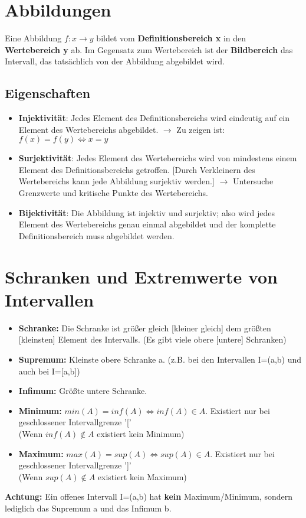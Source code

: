 \documentclass[a4paper,12pt]{article} %
\begin{document}
\section{Abbildungen}

Eine Abbildung $ f: x \rightarrow y $ bildet vom \textbf{Definitionsbereich x} in den \textbf{Wertebereich y} ab. Im Gegensatz zum Wertebereich ist der \textbf{Bildbereich} das Intervall, das tatsächlich von der Abbildung abgebildet wird.

\subsection{Eigenschaften}

\begin{itemize}
\item \textbf{Injektivität}: Jedes Element des Definitionsbereichs wird eindeutig auf ein Element des Wertebereichs abgebildet. $\rightarrow$ Zu zeigen ist: $f(x) = f(y) \Leftrightarrow x = y$
\item \textbf{Surjektivität}: Jedes Element des Wertebereichs wird von mindestens einem Element des Definitionsbereichs getroffen. [Durch Verkleinern des Wertebereichs kann jede Abbildung surjektiv werden.] $\rightarrow$ Untersuche Grenzwerte und kritische Punkte des Wertebereichs.
\item \textbf{Bijektivität}: Die Abbildung ist injektiv und surjektiv; also wird jedes Element des Wertebereichs genau einmal abgebildet und der komplette Definitionsbereich muss abgebildet werden.
\end{itemize}

\section{Schranken und Extremwerte von Intervallen}
\begin{itemize}
\item \textbf{Schranke:} Die Schranke ist größer gleich [kleiner gleich] dem größten [kleinsten] Element des Intervalls. (Es gibt viele obere [untere] Schranken)
\item \textbf{Supremum:} Kleinste obere Schranke a. (z.B. bei den Intervallen I=(a,b) und auch bei I=[a,b])
\item \textbf{Infimum:} Größte untere Schranke.
\item \textbf{Minimum:} $min(A)=inf(A) \Leftrightarrow inf(A) \in A $. Existiert nur bei geschlossener Intervallgrenze '[' \\
(Wenn $inf(A) \notin A $ existiert kein Minimum)
\item \textbf{Maximum:} $max(A)=sup(A) \Leftrightarrow sup(A) \in A $. Existiert nur bei geschlossener Intervallgrenze ']' \\
(Wenn $sup(A) \notin A $ existiert kein Maximum)
\end{itemize}
\textbf{Achtung:} Ein offenes Intervall I=(a,b) hat \textbf{kein} Maximum/Minimum, sondern lediglich das Supremum a und das Infimum b.
\end{document}
